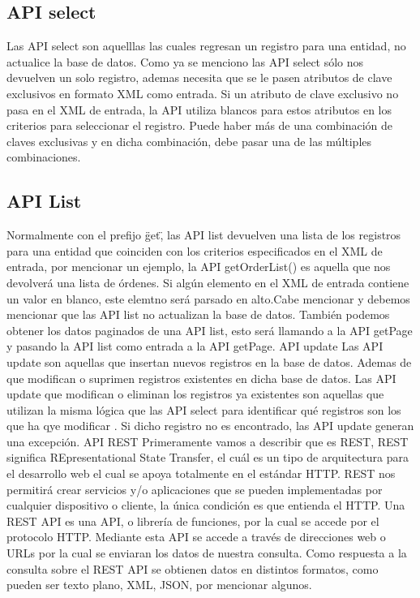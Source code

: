   \subsection{API select}
    Las API select son aquelllas las cuales regresan un registro para una entidad, no actualice la base de datos. Como ya se menciono las API select sólo nos devuelven un solo registro, ademas necesita que se le pasen atributos de clave exclusivos en formato XML como entrada. Si un atributo de clave exclusivo no pasa en el XML de entrada, la API utiliza blancos para estos atributos en los criterios para seleccionar el registro. Puede haber más de una combinación de claves exclusivas y en dicha combinación, debe pasar una de las múltiples combinaciones. 

  \subsection{API List}
    Normalmente con el prefijo \"get\", las API list devuelven una lista de los registros para una entidad que coinciden con los criterios especificados en el XML de entrada, por mencionar un ejemplo, la API getOrderList() es aquella que nos devolverá una lista de órdenes. Si algún elemento en el XML de entrada contiene un valor en blanco, este elemtno será parsado en alto.Cabe mencionar y debemos mencionar que las API list no actualizan la base de datos. También podemos obtener los datos paginados de una API list, esto será llamando a la API getPage y pasando la API list como entrada a la API getPage. API update Las API update son aquellas que insertan nuevos registros en la base de datos. Ademas de que modifican o suprimen registros existentes en dicha base de datos. Las API update que modifican o eliminan los registros ya existentes son aquellas que utilizan la misma lógica que las API select para identificar qué registros son los que ha qye modificar . Si dicho registro no es encontrado, las API update generan una excepción. API REST Primeramente vamos a describir que es REST, REST significa REpresentational State Transfer, el cuál es un tipo de arquitectura para el desarrollo web el cual se apoya totalmente en el estándar HTTP. REST nos permitirá crear servicios y/o aplicaciones que se pueden implementadas por cualquier dispositivo o cliente, la única condición es que entienda el HTTP. Una REST API es una API, o librería de funciones, por la cual se accede por el protocolo HTTP. Mediante esta API se accede a través de direcciones web o URLs por la cual se enviaran los datos de nuestra consulta. Como respuesta a la consulta sobre el REST API se obtienen datos en distintos formatos, como pueden ser texto plano, XML, JSON, por mencionar algunos. 

